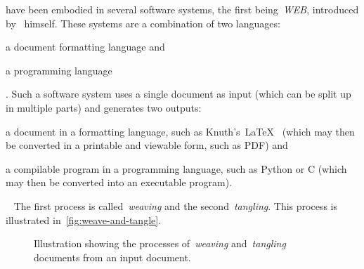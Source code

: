 \documentclass[%
    a4paper,    %
    justified,  %
    nobib,      %
    openany     %
]{tufte-book}
\makeatletter
\renewcommand{\label}[1]{\@tufte@label{##1}}%
\makeatother
\begin{document}
 have been embodied in several
software systems, the first being~\emph{WEB}, introduced
by~ himself. These systems are a combination of two
languages:
\begin{enumerate*}
  \item a document formatting language and
  \item a programming language
\end{enumerate*}.
Such a software system uses a single document as input (which can be split up in
multiple parts) and generates two outputs:
\begin{enumerate*}
  \item a document in a formatting language, such as
    Knuth's~\LaTeX{}~\cite{knuth-tex-1987} (which may then be converted in a
    printable and viewable form, such as PDF) and
  \item a compilable program in a programming language, such as Python or C
    (which may then be converted into an executable program).
\end{enumerate*}~\cite{knuth-lp-1984}
The first process is called~\emph{weaving} and the second~\emph{tangling}. This
process is illustrated in~\cref{fig:weave-and-tangle}.

\begin{figure}
  \caption{Illustration showing the processes of~\emph{weaving}
    and~\emph{tangling} documents from an input document.~\cite{knuth-lp-1984}}
\label{fig:weave-and-tangle}
\end{figure}
\end{document}

